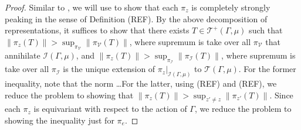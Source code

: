 \documentclass[12pt, class = article, crop = false, a4paper, twoside]{standalone}
\begin{document}
\begin{proof}
    
    Similar to \cite[Proposition 3.11]{DOMA17}, we will use \cite[Theorem 7.2]{ARWI11} to show that each $\pi_{z}$ is completely strongly peaking in the sense of Definition (REF). By the above decomposition of representations, it suffices to show that there exists $T\in \mathcal{T^{+}}(\Gamma, \mu)$ such that $\|\pi_{z}(T)\| > \sup_{\pi_{\mathcal{V}}}\|\pi_{\mathcal{V}}(T)\|$, where supremum is take over all $\pi_{\mathcal{V}}$ that annihilate $\mathcal{I}(\Gamma, \mu)$, and $\|\pi_{z}(T)\| > \sup_{\pi_{\mathcal{I}}}\|\pi_{\mathcal{I}}(T)\|$, where supremum is take over all $\pi_{\mathcal{I}}$ is the unique extension of $\pi_{z}|_{\mathcal{I}(\Gamma, \mu)}$ to $\mathcal{T}(\Gamma, \mu)$. For the former inequality, note that the norm \dots For the latter, using (REF) and (REF), we reduce the problem to showing that $\|\pi_{z}(T)\| > \sup_{z'\neq z}\|\pi_{z'}(T)\|$. Since each $\pi_{z}$ is equivariant with respect to the action of $\Gamma$, we reduce the problem to showing the inequality just for $\pi_{e}$.


\end{proof}
\end{document}
